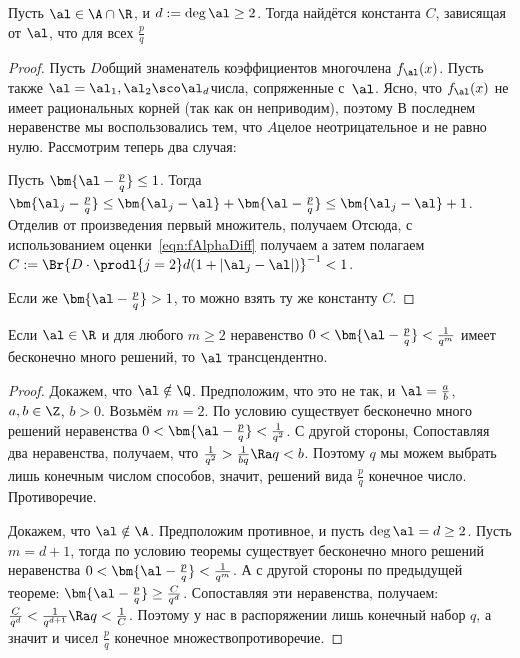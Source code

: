 \documentclass[a4paper]{article}
\begin{document}
\begin{theorem}[Лиувилль]
Пусть $\al\in\A\cap\R$, и  $d := \deg\al\ge2$. Тогда найдётся константа $C$, зависящая от $\al$, что для всех $\frac pq$
\end{theorem}
\begin{proof}
Пусть $D$\т  общий знаменатель коэффициентов многочлена $f_{\al}(x)$. Пусть также
$\al=\al_1,\al_2\sco \al_d$\т  числа, сопряженные с~$\al$. Ясно, что $f_{\al}(x)$ не
имеет рациональных корней (так как он неприводим), поэтому
В последнем неравенстве мы воспользовались тем, что $A$\т  целое неотрицательное и не равно нулю. Рассмотрим
теперь два случая:

 Пусть $\bm{\al-\frac{p}q}\le1$. Тогда
$\bm{\al_j-\frac{p}q}\le\bm{\al_j-\al}+\bm{\al-\frac{p}q}\le\bm{\al_j-\al} + 1$. Отделив от произведения первый
множитель, получаем
Отсюда, с использованием оценки~\eqref{eqn:fAlphaDiff} получаем
а затем полагаем
$C:=\Br{D\cdot\prodl{j=2}d(1+|\al_j-\al|)}^{-1}<1$.

Если же $\bm{\al-\frac{p}q}>1$, то можно взять ту же константу $C$.
\end{proof}

\begin{imp}
Если $\al\in\R$ и для любого $m\ge2$ неравенство $0<\bm{\al-\frac{p}q}<\frac1{q^m}$ имеет
бесконечно много решений, то $\al$ трансцендентно.
\end{imp}
\begin{proof}
 Докажем, что $\al\notin\Q$. Предположим, что это не так, и
$\al=\frac{a}b$, $a,b\in\Z$, $b>0$. Возьмём $m = 2$. По условию существует
бесконечно много решений неравенства $0<\bm{\al-\frac{p}q}<\frac1{q^2}$. С другой стороны,
Сопоставляя два неравенства, получаем, что $\frac1{q^2}>\frac1{bq}\Ra q < b$. Поэтому $q$ мы можем выбрать лишь
конечным числом способов, значит, решений вида $\frac{p}q$ конечное число. Противоречие.

 Докажем, что $\al \notin \A$. Предположим противное, и пусть $\deg\al=d\ge2$.
Пусть $m=d+1$, тогда по условию теоремы существует бесконечно
много решений неравенства $0<\bm{\al-\frac{p}q}<\frac1{q^m}$. А с другой стороны по предыдущей теореме:
$\bm{\al-\frac{p}q}\ge\frac{C}{q^d}$. Сопоставляя эти неравенства, получаем:
$\frac{C}{q^d}<\frac1{q^{d+1}}\Ra q<\frac1C$. Поэтому у нас в распоряжении лишь конечный набор $q$, а значит
и чисел $\frac{p}q$ конечное множество\т  противоречие.
\end{proof}
\end{document}
